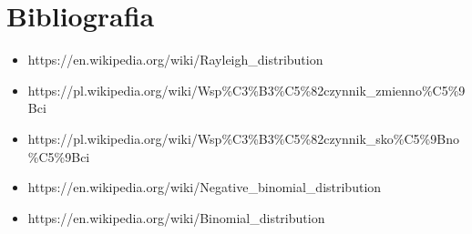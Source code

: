 \documentclass{article}
\begin{document}
\newpage
\section{Bibliografia}
\begin{itemize}
\item https://en.wikipedia.org/wiki/Rayleigh\_distribution
\item https://pl.wikipedia.org/wiki/Wsp\%C3\%B3\%C5\%82czynnik\_zmienno\%C5\%9Bci
\item https://pl.wikipedia.org/wiki/Wsp\%C3\%B3\%C5\%82czynnik\_sko\%C5\%9Bno\%C5\%9Bci
\item https://en.wikipedia.org/wiki/Negative\_binomial\_distribution
\item https://en.wikipedia.org/wiki/Binomial\_distribution
\end{itemize}
\end{document}

